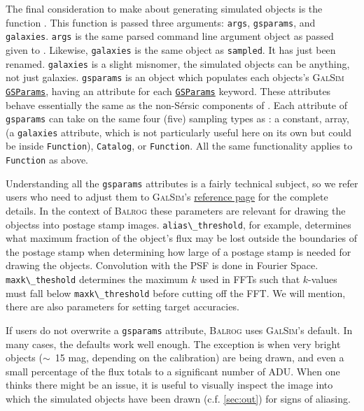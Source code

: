 \documentclass[11pt]{book}
\newcommand{\codett}[1]{\lstinline{#1}}
\newcommand{\galsim}{\textsc{GalSim}}
\newcommand{\balrog}{\textsc{Balrog}}
\newcommand{\sersic}{S\'{e}rsic}
\begin{document}
The final consideration to make about generating simulated objects is the function \gspfunc{}.
This function is passed three arguments: \codett{args}, \codett{gsparams}, and \codett{galaxies}.
\codett{args} is the same parsed command line argument object as passed given to \simfunc{}.
Likewise, \codett{galaxies} is the same object as \codett{sampled}.
It has just been renamed.
\codett{galaxies} is a slight misnomer, the simulated objects can be anything, not just galaxies.
\codett{gsparams} is an object which populates each objects's \galsim{} 
\href{http://galsim-developers.github.io/GalSim/structgalsim\_1\_1\_g\_s\_params.html}{\texttt{GSParams}}, having an attribute for each  
\href{http://galsim-developers.github.io/GalSim/structgalsim\_1\_1\_g\_s\_params.html}{\texttt{GSParams}} keyword.
These attributes behave essentially the same as the non-\sersic{} components of \simrules{}.
Each attribute of \codett{gsparams} can take on the same four (five) sampling types as \simrules{}:
a constant, array, (a \codett{galaxies} attribute, which is not particularly useful here on its own but could be
inside \codett{Function}), \codett{Catalog}, or \codett{Function}.
All the same functionality applies to \codett{Function} as above.

Understanding all the \codett{gsparams} attributes is a fairly technical subject, so we
refer users who need to adjust them to 
\galsim{}'s \href{http://galsim-developers.github.io/GalSim/structgalsim\_1\_1\_g\_s\_params.html}{reference page}
for the complete details.
In the context of \balrog{} these parameters are relevant for drawing the objectss into postage stamp images.
\codett{alias\_threshold}, for example, determines what maximum fraction of the object's flux may be lost outside the boundaries
of the postage stamp when determining how large of a postage stamp is needed for drawing the objects.
Convolution with the PSF is done in Fourier Space.
\codett{maxk\_theshold} determines the maximum $k$ used in FFTs such that $k$-values must fall below \codett{maxk\_threshold}
before cutting off the FFT. We will mention, there are also parameters for setting target accuracies.

If users do not overwrite a \codett{gsparams} attribute, \balrog{} uses \galsim{}'s default.
In many cases, the defaults work well enough. The exception is when very bright objects ($\sim$~15 mag, depending on the calibration)
are being drawn, and even a small percentage of the flux totals to a significant number of ADU.
When one thinks there might be an issue, 
it is useful to visually inspect the image into which the simulated objects have been drawn (c.f. \autoref{sec:out})
for signs of aliasing.
\end{document}
